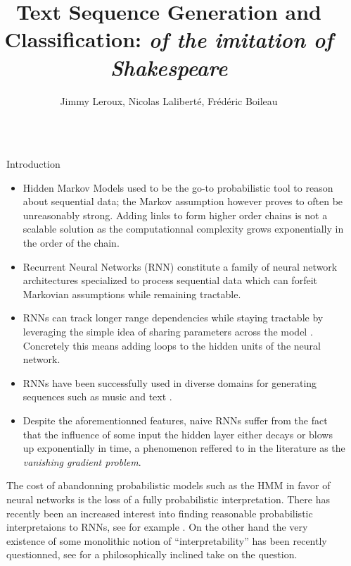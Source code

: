 \documentclass[final]{beamer}
\title{Text Sequence Generation and Classification: \textit{of the imitation of
Shakespeare}}
\author{Jimmy Leroux, Nicolas Laliberté, Frédéric Boileau}
\institute[]{Départment d'Informatique et de Recherche Opérationnelle -
Université de Montréal}
\newlength{\sepwidth}
\newlength{\colwidth}
\newcommand{\separatorcolumn}{\begin{column}{\sepwidth}\end{column}}
\begin{document}
\begin{frame}[t]
\begin{columns}[t]
\separatorcolumn

\begin{column}{\colwidth}

\begin{block}{Introduction}
\begin{itemize}
\item Hidden Markov Models used to be the go-to probabilistic tool to reason
    about sequential data; the Markov assumption however proves to often be
    unreasonably strong. Adding links to form higher order chains is not a
    scalable solution as the computationnal complexity grows exponentially in
    the order of the chain.

\item Recurrent Neural Networks (RNN) constitute a family of neural network
architectures specialized to process sequential data which can forfeit
Markovian assumptions while remaining tractable.

\item RNNs can track longer range dependencies while
    staying tractable by leveraging the simple idea of sharing parameters
    across the model \cite{deeplearning}. Concretely this means adding loops to
    the hidden units of the neural network.

\item RNNs have been successfully used in diverse domains for
  generating sequences such as music and text \cite{gravesGenerating}. 

\item Despite the aforementionned features, naive RNNs suffer from the fact 
that the influence of some input the hidden layer either decays or blows up
exponentially in time, a phenomenon reffered to in the literature as the
\textit{vanishing gradient problem}.
\end{itemize}
The cost of abandonning probabilistic models such as the HMM in favor of neural
networks is the loss of a fully probabilistic interpretation. There has
recently been an increased interest into finding reasonable probabilistic
interpretaions to RNNs, see for example \cite{finnish}. On the other hand the
very existence of some monolithic notion of ``interpretability'' has been
recently questionned, see \cite{mythos} for a philosophically inclined take
on the question.
\end{block}


\end{column}
\end{columns}
\end{frame}
\end{document}

